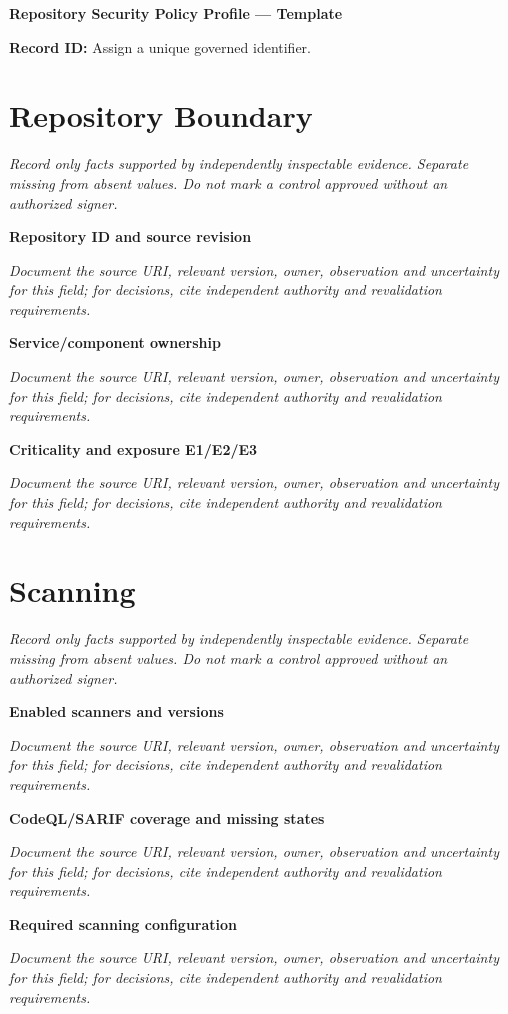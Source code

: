 \documentclass[11pt,letterpaper]{article}
\begin{document}
\begin{center}{\LARGE\bfseries Repository Security Policy Profile --- Template}\par
\vspace{4pt}{\small Guided authoring instrument (not a completed assessment)}\par
\end{center}
\noindent\textbf{Record ID:} Assign a unique governed identifier.\par
\section{Repository Boundary}
\noindent\emph{Record only facts supported by independently inspectable evidence. Separate missing from absent values. Do not mark a control approved without an authorized signer.}\par
\noindent\textbf{Repository ID and source revision}\par
\noindent\emph{Document the source URI, relevant version, owner, observation and uncertainty for this field; for decisions, cite independent authority and revalidation requirements.}\par\medskip
\noindent\textbf{Service/component ownership}\par
\noindent\emph{Document the source URI, relevant version, owner, observation and uncertainty for this field; for decisions, cite independent authority and revalidation requirements.}\par\medskip
\noindent\textbf{Criticality and exposure E1/E2/E3}\par
\noindent\emph{Document the source URI, relevant version, owner, observation and uncertainty for this field; for decisions, cite independent authority and revalidation requirements.}\par\medskip
\section{Scanning}
\noindent\emph{Record only facts supported by independently inspectable evidence. Separate missing from absent values. Do not mark a control approved without an authorized signer.}\par
\noindent\textbf{Enabled scanners and versions}\par
\noindent\emph{Document the source URI, relevant version, owner, observation and uncertainty for this field; for decisions, cite independent authority and revalidation requirements.}\par\medskip
\noindent\textbf{CodeQL/SARIF coverage and missing states}\par
\noindent\emph{Document the source URI, relevant version, owner, observation and uncertainty for this field; for decisions, cite independent authority and revalidation requirements.}\par\medskip
\noindent\textbf{Required scanning configuration}\par
\noindent\emph{Document the source URI, relevant version, owner, observation and uncertainty for this field; for decisions, cite independent authority and revalidation requirements.}\par\medskip
\end{document}
